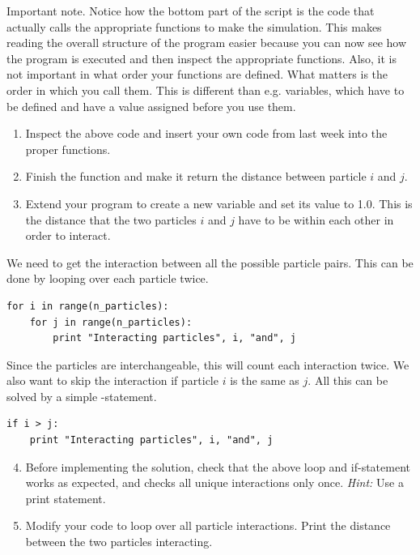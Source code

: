 \documentclass{article}
\begin{document}
\newpage
Important note.
Notice how the bottom part of the script is the code that actually calls the
appropriate functions to make the simulation.  This makes reading the overall
structure of the program easier because you can now see how the program is
executed and then inspect the appropriate functions.  Also, it is not important
in what order your functions are defined. What matters is the order in which you
call them. This is different than e.g. variables, which have to be defined and have a value assigned before you use them.

\begin{enumerate}
  \setcounter{enumi}{0}
  \item Inspect the above code and insert your own code from last week into the proper functions.

  \item Finish the function  and make it return
    the distance  between particle $i$ and $j$.

    \item Extend your program to create a new variable  and set its
    value to 1.0.
    This is the distance that the two particles $i$ and $j$ have to be within each other
    in order to interact.

\end{enumerate}

We need to get the interaction between all the possible particle pairs.
This can be done by looping over each particle twice.

\begin{lstlisting}
for i in range(n_particles):
    for j in range(n_particles):
        print "Interacting particles", i, "and", j
\end{lstlisting}

Since the particles are interchangeable, this will count each interaction twice.
We also want to skip the interaction if particle $i$ is the same as $j$.
All this can be solved by a simple -statement.

\begin{lstlisting}
if i > j:
    print "Interacting particles", i, "and", j

\end{lstlisting}

\begin{enumerate}
  \setcounter{enumi}{3}
  \item Before implementing the solution, check that the above loop and
      if-statement works as expected, and checks all unique interactions only once. 
      {\em Hint:} Use a print statement.

  \item Modify your code to loop over all particle interactions.
      Print the distance between the two particles interacting.

\end{enumerate}
\end{document}
